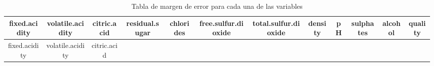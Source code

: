 \documentclass[
]{article}
\begin{document}
\begin{longtable}[]{@{}cccccccccccc@{}}
\caption{Tabla de margen de error para cada una de las
variables}\tabularnewline
\toprule
\begin{minipage}[b]{0.06\columnwidth}\centering
fixed.acidity\strut
\end{minipage} & \begin{minipage}[b]{0.08\columnwidth}\centering
volatile.acidity\strut
\end{minipage} & \begin{minipage}[b]{0.06\columnwidth}\centering
citric.acid\strut
\end{minipage} & \begin{minipage}[b]{0.07\columnwidth}\centering
residual.sugar\strut
\end{minipage} & \begin{minipage}[b]{0.05\columnwidth}\centering
chlorides\strut
\end{minipage} & \begin{minipage}[b]{0.09\columnwidth}\centering
free.sulfur.dioxide\strut
\end{minipage} & \begin{minipage}[b]{0.09\columnwidth}\centering
total.sulfur.dioxide\strut
\end{minipage} & \begin{minipage}[b]{0.04\columnwidth}\centering
density\strut
\end{minipage} & \begin{minipage}[b]{0.03\columnwidth}\centering
pH\strut
\end{minipage} & \begin{minipage}[b]{0.05\columnwidth}\centering
sulphates\strut
\end{minipage} & \begin{minipage}[b]{0.04\columnwidth}\centering
alcohol\strut
\end{minipage} & \begin{minipage}[b]{0.04\columnwidth}\centering
quality\strut
\end{minipage}\tabularnewline
\midrule
\endfirsthead
\toprule
\begin{minipage}[b]{0.06\columnwidth}\centering
fixed.acidity\strut
\end{minipage} & \begin{minipage}[b]{0.08\columnwidth}\centering
volatile.acidity\strut
\end{minipage} & \begin{minipage}[b]{0.06\columnwidth}\centering
citric.acid\strut

\end{minipage}
\end{longtable}
\end{document}
